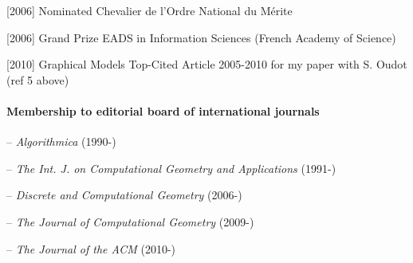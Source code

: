 [2006] Nominated Chevalier de l'Ordre National du M\'erite

[2006] Grand Prize EADS in Information Sciences (French Academy of Science)

[2010] Graphical Models Top-Cited Article 2005-2010 for  my paper with S. Oudot (ref 5 above) 


\paragraph{Membership to editorial board of international journals}   \mbox{}

-- {\em Algorithmica} (1990-)

-- {\em The Int. J. on Computational Geometry and Applications} (1991-)

-- {\em Discrete and Computational Geometry } (2006-)

-- {\em The Journal of Computational Geometry} (2009-)

-- {\em The Journal of the ACM }(2010-)